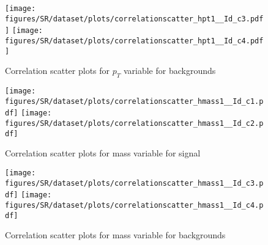 \begin{figure}[!htb]%
\centering
\texttt{[image: figures/SR/dataset/plots/correlationscatter\_hpt1\_\_Id\_c3.pdf]}
\texttt{[image: figures/SR/dataset/plots/correlationscatter\_hpt1\_\_Id\_c4.pdf]}
\caption{ Correlation scatter plots for \HBB $p_{T}$ variable for backgrounds}%
\label{fig:correlations_SR_hpt1_BG}                                                       
\end{figure}



\begin{figure}[!htb]%
\centering
\texttt{[image: figures/SR/dataset/plots/correlationscatter\_hmass1\_\_Id\_c1.pdf]}
\texttt{[image: figures/SR/dataset/plots/correlationscatter\_hmass1\_\_Id\_c2.pdf]}
\caption{ Correlation scatter plots for \HBB mass  variable for signal}%
\label{fig:correlations_SR_hmass1_S}                                                       
\end{figure}


\begin{figure}[!htb]%
\centering
\texttt{[image: figures/SR/dataset/plots/correlationscatter\_hmass1\_\_Id\_c3.pdf]}
\texttt{[image: figures/SR/dataset/plots/correlationscatter\_hmass1\_\_Id\_c4.pdf]}
\caption{ Correlation scatter plots for \HBB mass variable for backgrounds}%
\label{fig:correlations_SR_hmass1_BG}                                                       
\end{figure}
 

